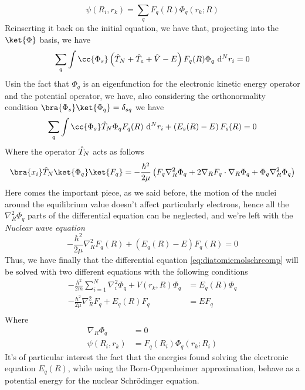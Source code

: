 \documentclass[../qm.tex]{subfiles}
\begin{document}
	\begin{equation}
		\psi(R_i,r_k)=\sum_qF_q(R)\Phi_q(r_k;R)
		\label{eq:psiexpansion}
	\end{equation}
	Reinserting it back on the initial equation, we have that, projecting into the $\ket{\Phi}$ basis, we have
	\begin{equation}
		\sum_q\int\cc{\Phi_s}\left( \opr{T}_N+\opr{T}_e+\opr{V}-E \right)F_q(R)\Phi_q\diff[N]{r_i}=0
		\label{eq:phiprojectionbornopp}
	\end{equation}
	Usin the fact that $\Phi_q$ is an eigenfunction for the electronic kinetic energy operator and the potential operator, we have, also considering the orthonormality condition $\bra{\Phi_s}\ket{\Phi_q}=\delta_{sq}$ we have
	\begin{equation}
		\sum_q\int\cc{\Phi_s}\opr{T}_N\Phi_qF_q(R)\diff[N]r_i+\left( E_s(R)-E \right)F_s(R)=0
		\label{eq:substitutionbornopp}
	\end{equation}
	Where the operator $\hat{T}_N$ acts as follows
	\begin{equation}
		\bra{x_i}\opr{T}_N\ket{\Phi_q}\ket{F_q}=-\frac{\hbar^2}{2\mu}\left( F_q\nabla_R^2\Phi_q+2\nabla_RF_q\cdot\nabla_R\Phi_q+\Phi_q\nabla^2_R\Phi_q \right)
		\label{eq:bornoppenheimerapprox}
	\end{equation}
	Here comes the important piece, as we said before, the motion of the nuclei around the equilibrium value doesn't affect particularly electrons, hence all the $\nabla_R^2\Phi_q$ parts of the differential equation can be neglected, and we're left with the \textit{Nuclear wave equation}
	\begin{equation}
		-\frac{\hbar^2}{2\mu}\nabla_R^2F_q(R)+(E_q(R)-E)F_q(R)=0
		\label{eq:nuclearwaveequationbornopp}
	\end{equation}
	Thus, we have finally that the differential equation \eqref{eq:diatomicmolschrcomp} will be solved with two different equations with the following conditions
	\begin{equation*}
		\begin{aligned}
			-\frac{\hbar^2}{2m}\sum_{i=1}^N\nabla_i^2\Phi_q+V(r_k,R)\Phi_q&=E_q(R)\Phi_q\\
			-\frac{\hbar^2}{2\mu}\nabla_R^2F_q+E_q(R)F_q&=EF_q\\
		\end{aligned}
		\label{eq:bornoppenheimerlist}
	\end{equation*}
	Where
	\begin{equation*}
		\begin{aligned}
			\nabla_R\Phi_q&=0\\
			\psi(R_i,r_k)&=F_q(R_i)\Phi_q(r_k;R_i)
		\end{aligned}
	\end{equation*}
	It's of particular interest the fact that the energies found solving the electronic equation $E_q(R)$, while using the Born-Oppenheimer approximation, behave as a potential energy for the nuclear Schrödinger equation.
\end{document}
